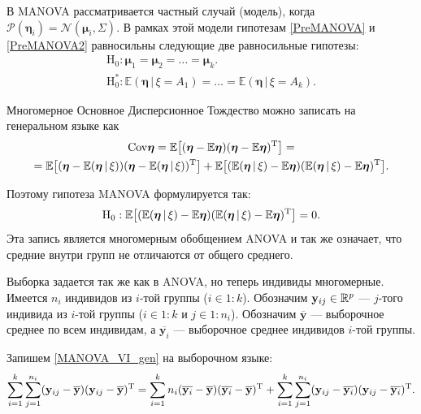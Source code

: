 В MANOVA рассматривается частный случай (модель), когда $\mathcal P(\bm \eta_i) = \mathcal N(\bm \mu_i, \Sigma)$.
В рамках этой модели гипотезам \eqref{PreMANOVA} и \eqref{PreMANOVA2} равносильны следующие две равносильные гипотезы:
\begin{gather}
    \label{MANOVA}
    \mathrm H_0: \bm \mu_1 = \bm \mu_2 = \ldots = \bm \mu_k.\\
    \mathrm H_0^*: \mathbb E (\bm \eta \, | \, \xi = A_1) = \ldots = \mathbb E (\bm \eta \, | \, \xi = A_k).
    \nonumber
\end{gather}

Многомерное Основное Дисперсионное Тождество можно записать на генеральном языке как
\begin{gather}
    \label{MANOVA_VI_gen}
    \mathrm {Cov} \bm \eta =
    \mathbb E \big[(\bm \eta - \mathbb E \bm \eta) (\bm \eta - \mathbb E \bm \eta)^{\mathrm{T}}\big] = \\ =
    \mathbb E \big[(\bm \eta - \mathbb E (\bm \eta \, | \, \xi))
              (\bm \eta - \mathbb E (\bm \eta \, | \, \xi))^{\mathrm{T}}\big] +
    \mathbb E \big[(\mathbb E (\bm \eta \, | \, \xi) - \mathbb E \bm \eta)
              (\mathbb E (\bm \eta \, | \, \xi) - \mathbb E \bm \eta)^{\mathrm{T}}\big].
\end{gather}

Поэтому гипотеза MANOVA формулируется так: 
\begin{gather}
    \label{MANOVA_VI_H}
    \mathrm H_0:
    \mathbb E \big[(\mathbb E (\bm \eta \, | \, \xi) - \mathbb E \bm \eta)
              (\mathbb E (\bm \eta \, | \, \xi) - \mathbb E \bm \eta)^{\mathrm{T}}\big]
    = 0.
\end{gather}
Эта запись является многомерным обобщением ANOVA и так же означает, что средние внутри групп не отличаются от общего среднего.

Выборка задается так же как в ANOVA, но теперь индивиды многомерные.
Имеется $n_i$ индивидов из $i$-той группы ($i \in 1:k$).
Обозначим $\mathbf y_{ij} \in \mathbb{R}^p$%
--- $j$-того индивида из $i$-той группы ($i \in 1:k$ и $j \in 1:n_i$).
Обозначим $\overline {\mathbf y}$ --- выборочное среднее по всем индивидам, а $\overline {\mathbf y_i}$
--- выборочное среднее индивидов $i$-той группы.

Запишем \eqref{MANOVA_VI_gen} на выборочном языке:
\begin{gather}
    \label{VI_MANOVA}
    \sum_{i=1}^k \sum_{j=1}^{n_i} (\mathbf y_{ij} - \overline {\mathbf y}) (\mathbf y_{ij} - \overline {\mathbf y})^{\mathrm{T}} =
    \sum_{i=1}^k n_i (\overline {\mathbf y_i} - \overline {\mathbf y}) (\overline {\mathbf y_i} - \overline {\mathbf y})^{\mathrm{T}} +
    \sum_{i=1}^k \sum_{j=1}^{n_i} (\mathbf y_{ij} - \overline {\mathbf y_i}) (\mathbf y_{ij} - \overline {\mathbf y_i})^{\mathrm{T}}.
\end{gather}

